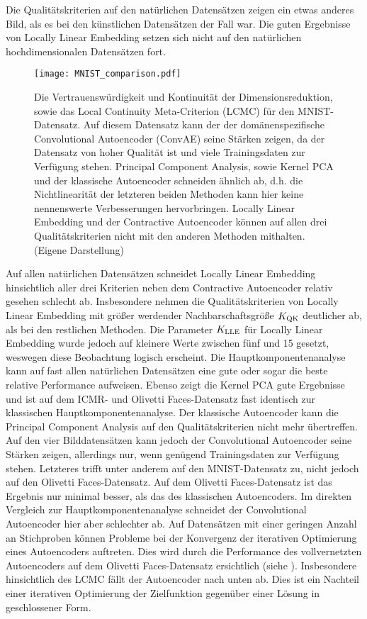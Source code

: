 Die Qualitätskriterien auf den natürlichen Datensätzen zeigen ein etwas anderes Bild, als es bei
den künstlichen Datensätzen der Fall war. Die guten Ergebnisse von Locally Linear Embedding setzen
sich nicht auf den natürlichen hochdimensionalen Datensätzen fort.
\begin{figure}[ht]
	\begin{center}
		\texttt{[image: MNIST\_comparison.pdf]}
	\end{center}
	\caption[Qualitätskriterien für MNIST]{Die Vertrauenswürdigkeit und Kontinuität der Dimensionsreduktion, sowie das Local Continuity Meta-Criterion (LCMC) für den MNIST-Datensatz. Auf diesem Datensatz kann der der domänenspezifische Convolutional Autoencoder (ConvAE) seine Stärken zeigen, da der Datensatz von hoher Qualität ist und viele Trainingsdaten zur Verfügung stehen. Principal Component Analysis, sowie Kernel PCA und der klassische Autoencoder schneiden ähnlich ab, d.h. die Nichtlinearität der letzteren beiden Methoden kann hier keine nennenswerte Verbesserungen hervorbringen. Locally Linear Embedding und der Contractive Autoencoder können auf allen drei Qualitätskriterien nicht mit den anderen Methoden mithalten. (Eigene Darstellung)}
	\label{fig:MNISTMetrics}
\end{figure}
Auf allen natürlichen Datensätzen
schneidet Locally Linear Embedding hinsichtlich aller drei Kriterien neben dem Contractive Autoencoder relativ gesehen schlecht ab. Insbesondere nehmen die
Qualitätskriterien von Locally Linear Embedding mit größer werdender Nachbarschaftsgröße $K_{\text{QK}}$ deutlicher ab, als bei den
restlichen Methoden. Die Parameter $K_{\text{LLE}}$ für Locally Linear Embedding wurde jedoch auf kleinere Werte zwischen fünf und 15 gesetzt, weswegen diese Beobachtung logisch erscheint. Die Hauptkomponentenanalyse kann auf fast allen natürlichen Datensätzen eine gute oder sogar die
beste relative Performance aufweisen. Ebenso zeigt die Kernel PCA gute Ergebnisse und ist auf dem ICMR- und Olivetti Faces-Datensatz fast identisch zur klassischen Hauptkomponentenanalyse. Der klassische Autoencoder kann die Principal Component Analysis auf den Qualitätskriterien nicht mehr übertreffen. Auf den vier Bilddatensätzen kann jedoch der Convolutional
Autoencoder seine Stärken zeigen, allerdings nur, wenn genügend Trainingsdaten zur Verfügung stehen. Letzteres trifft unter anderem auf den MNIST-Datensatz zu, nicht jedoch auf den Olivetti Faces-Datensatz. Auf dem Olivetti Faces-Datensatz ist das Ergebnis nur minimal besser, als das des klassischen Autoencoders. Im direkten Vergleich zur Hauptkomponentenanalyse schneidet der Convolutional Autoencoder hier aber schlechter ab.
Auf Datensätzen mit einer geringen Anzahl an Stichproben können Probleme bei der Konvergenz der iterativen Optimierung eines Autoencoders auftreten. Dies wird durch die Performance des vollvernetzten Autoencoders auf dem Olivetti Faces-Datensatz ersichtlich (siehe ). Insbesondere hinsichtlich des LCMC fällt der Autoencoder nach unten ab. Dies ist ein Nachteil einer iterativen Optimierung der Zielfunktion gegenüber einer Lösung in geschlossener Form.


